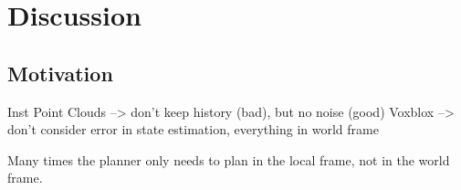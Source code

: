 \documentclass[letterpaper, 10 pt, conference]{ieeeconf}  %
\begin{document}
\clearpage




\clearpage

\section{Discussion}
\subsection{Motivation}
Inst Point Clouds --> don't keep history (bad), but no noise (good)
Voxblox --> don't consider error in state estimation, everything in world frame

Many times the planner only needs to plan in the local frame, not in the world frame. 
\end{document}
